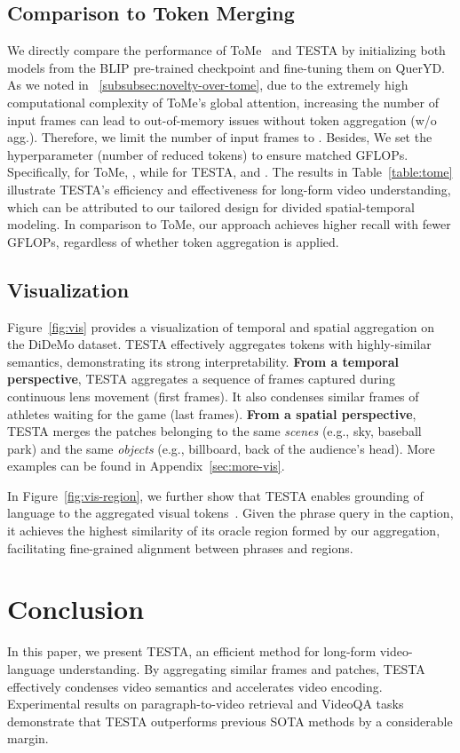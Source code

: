 \documentclass[11pt]{article}
\newcommand{\modelname}{TESTA\xspace}
\begin{document}
 \subsection{Comparison to Token Merging}
\label{subsec:cmp-tome}
We directly compare the performance of ToMe~\citep{Bolya2022TokenMY} and \modelname by initializing both models from the BLIP pre-trained checkpoint and fine-tuning them on QuerYD. As we noted in \textsection~\ref{subsubsec:novelty-over-tome}, due to the extremely high computational complexity of ToMe's global attention, increasing the number of input frames can lead to out-of-memory issues without token aggregation (w/o agg.). Therefore, we limit the number of input frames to . Besides, We set the hyperparameter  (number of reduced tokens) to ensure matched GFLOPs. Specifically, for ToMe, , while for \modelname,  and . 
The results in Table~\ref{table:tome} illustrate \modelname's efficiency and effectiveness for long-form video understanding, which can be attributed to our tailored design for divided spatial-temporal modeling. In comparison to ToMe, our approach achieves higher recall with fewer GFLOPs, regardless of whether token aggregation is applied.

\subsection{Visualization}
Figure~\ref{fig:vis} provides a visualization of temporal and spatial aggregation on the DiDeMo dataset. \modelname effectively aggregates tokens with highly-similar semantics, demonstrating its strong interpretability. 
\textbf{From a temporal perspective}, \modelname aggregates a sequence of frames captured during continuous lens movement (first  frames). It also condenses similar frames of athletes waiting for the game (last  frames). 
\textbf{From a spatial perspective}, \modelname merges the patches belonging to the same \textit{scenes} (e.g., sky, baseball park) and the same \textit{objects} (e.g., billboard, back of the audience's head).
More examples can be found in Appendix~\ref{sec:more-vis}.

In Figure~\ref{fig:vis-region}, we further show that \modelname enables grounding of language to the aggregated visual tokens~\citep{Ren2023PromptPW, ren-etal-2023-delving}. 
Given the phrase query in the caption, it achieves the highest similarity of its oracle region formed by our aggregation, facilitating fine-grained alignment between phrases and regions. 


\section{Conclusion}
In this paper, we present \modelname, an efficient method for long-form video-language understanding. 
By aggregating similar frames and patches, \modelname effectively condenses video semantics and accelerates video encoding. 
Experimental results on paragraph-to-video retrieval and VideoQA tasks demonstrate that \modelname outperforms previous SOTA methods by a considerable margin. 
\end{document}
